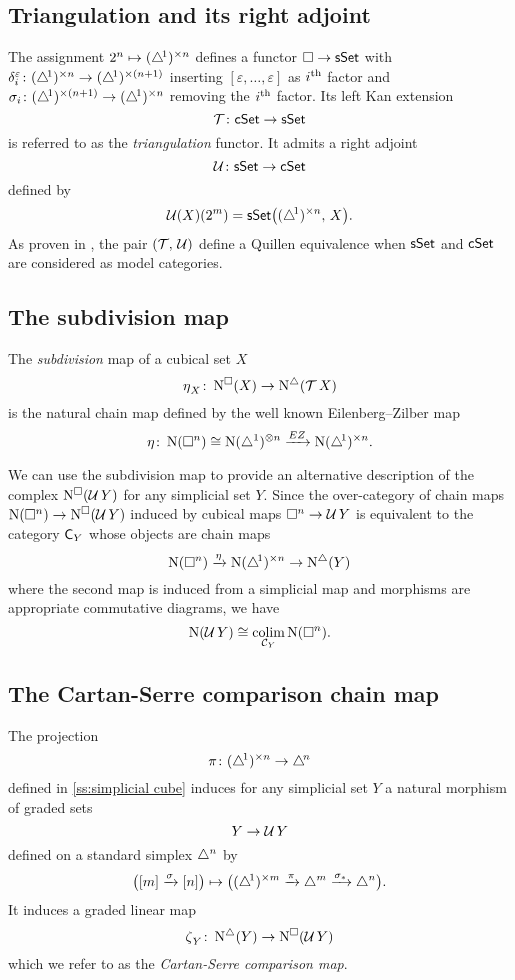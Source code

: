 \subsection{Triangulation and its right adjoint}

The assignment $2^n \mapsto (\triangle^{\!1})^{\times n}$ defines a functor $\square \to \mathsf{sSet}$ with $\delta_i^\varepsilon \colon (\triangle^{\!1})^{\times n} \to (\triangle^{\!1})^{\times (n+1)}$ inserting $[\varepsilon, \dots, \varepsilon]$ as $i^{\mathrm{th}}$ factor and $\sigma_i \colon (\triangle^{\!1})^{\times (n+1)} \to (\triangle^{\!1})^{\times n}$ removing the $i^{\mathrm{th}}$ factor.
Its left Kan extension
\[
\operatorname{\mathcal{T}} \colon \mathsf{cSet} \to \mathsf{sSet}
\]
is referred to as the \textit{triangulation} functor.
It admits a right adjoint
\[
\operatorname{\mathcal{U}} \colon \mathsf{sSet} \to \mathsf{cSet}
\]
defined by
\[
\operatorname{\mathcal{U}}(X)(2^m) = \mathsf{sSet} \big( (\triangle^{\!1})^{\times n}, \, X \big).
\]
As proven in \cite[8.4.30]{cisinski2006presheaves}, the pair $(\operatorname{\mathcal{T}},\, \operatorname{\mathcal{U}})$ define a Quillen equivalence when $\mathsf{sSet}$ and $\mathsf{cSet}$ are considered as model categories.
\subsection{The subdivision map}

The \textit{subdivision} map of a cubical set $X$
\[
\operatorname{\eta}_X \colon \operatorname{N^{\square}}(X) \to \operatorname{N^{\triangle}}(\operatorname{\mathcal{T}} X)
\]
is the natural chain map defined by the well known Eilenberg--Zilber map
\[
\operatorname{\eta} \colon \operatorname{N}(\square^n) \cong \operatorname{N}(\triangle^1)^{\otimes n} \xrightarrow{EZ} \operatorname{N} (\triangle^{\!1})^{\times n}.
\]

We can use the subdivision map to provide an alternative description of the complex $\operatorname{N^{\square}}(\operatorname{\mathcal{U}} Y)$ for any simplicial set $Y$.
Since the over-category of chain maps $\operatorname{N}(\square^n) \to \operatorname{N^{\square}}(\operatorname{\mathcal{U}} Y)$ induced by cubical maps $\square^n \to \operatorname{\mathcal{U}} Y$ is equivalent to the category $\mathsf{C}_Y$ whose objects are chain maps
\[
\operatorname{N}(\square^n) \xrightarrow{\operatorname{\eta}} \operatorname{N} (\triangle^{\!1})^{\times n} \to \operatorname{N^{\triangle}}(Y)
\]
where the second map is induced from a simplicial map
and morphisms are appropriate commutative diagrams, we have
\begin{equation} \label{e:alternative description of NUY}
\operatorname{N}(\operatorname{\mathcal{U}} Y) \cong \operatorname*{colim}_{\mathcal{C}_Y} \operatorname{N}(\square^n).
\end{equation}

\subsection{The Cartan-Serre comparison chain map} \label{ss:comparison map}

The projection
\[
\operatorname{\pi} \colon (\triangle^{\!1})^{\times n} \to \triangle^{\!n}
\]
defined in \cref{ss:simplicial cube} induces for any simplicial set $Y$ a natural morphism of graded sets
\[
Y \to \operatorname{\mathcal{U}} Y
\]
defined on a standard simplex $\triangle^n$ by
\[
\big( [m] \xrightarrow{\sigma} [n] \big) \mapsto
\big( (\triangle^{\!1})^{\times m} \xrightarrow{\operatorname{\pi}} \triangle^m \xrightarrow{\sigma_\ast} \triangle^n \big).
\]
It induces a graded linear map
\[
\operatorname{\zeta}_Y \colon \operatorname{N^{\triangle}}(Y) \to \operatorname{N^{\square}}(\operatorname{\mathcal{U}} Y)
\]
which we refer to as the \textit{Cartan-Serre comparison map}.

